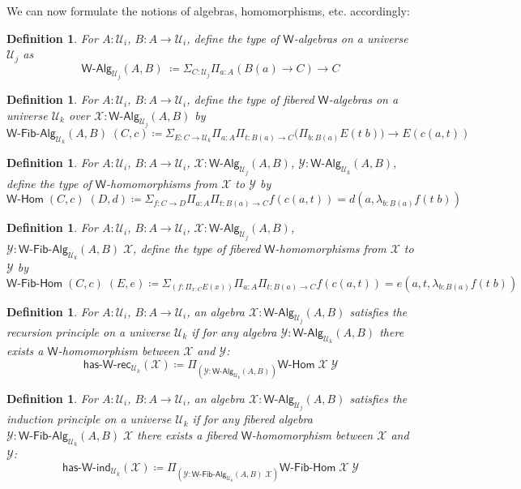 \documentclass[reqno,10pt,a4paper,oneside]{amsart}
\newcommand{\X}{\mathcal{X}}
\newcommand{\Y}{\mathcal{Y}}
\newcommand{\prd}[1]{\Pi_{#1}}
\newcommand{\sm}[1]{\Sigma_{#1}}
\newcommand{\lam}[1]{\lambda_{#1}}
\newcommand{\defeq}{\coloneqq}
\newcommand{\W}{\mathsf{W}}
\newcommand{\UU}{\mathcal{U}}
\newcommand{\WAlg}{\mathsf{W}\text{-}\mathsf{Alg}}
\newcommand{\WFibAlg}{\mathsf{W}\text{-}\mathsf{Fib}\text{-}\mathsf{Alg}}
\newcommand{\WHom}{\mathsf{W}\text{-}\mathsf{Hom}}
\newcommand{\WFibHom}{\mathsf{W}\text{-}\mathsf{Fib}\text{-}\mathsf{Hom}}
\newcommand{\HasWRec}{\mathsf{has}\text{-}\mathsf{W}\text{-}\mathsf{rec}}
\newcommand{\HasWInd}{\mathsf{has}\text{-}\mathsf{W}\text{-}\mathsf{ind}}
\numberwithin{equation}{section}
\theoremstyle{mythm}
\theoremstyle{mydef}
\newtheorem{definition}[theorem]{Definition}
\theoremstyle{myrmk}
\begin{document}
We can now formulate the notions of algebras, homomorphisms, etc. accordingly:

\begin{definition}\label{def:WAlg}
For $A:\UU_i$, $B : A \to \UU_i$, define the type of \emph{$\W$-algebras} on a universe $\UU_j$ as
\[\WAlg_{\UU_j}(A,B) \; \defeq \sm{C : \UU_j} \prd{a:A} (B(a) \to C) \to C \]
\end{definition}

\begin{definition}\label{def:WFibAlg}
For $A:\UU_i$, $B : A \to \UU_i$, define the type of \emph{fibered $\W$-algebras} on a universe $\UU_k$ over $\mathcal{X} : \WAlg_{\UU_j}(A,B)$ by
\[\WFibAlg_{\UU_k}(A,B) \; (C,c) \defeq \sm{E : C \to \UU_k} \prd{a:A}\prd{t: B(a) \to C} \big(\prd{b:B(a)} E(t \;b) \big) \to E(c(a,t)) \]
\end{definition}

\begin{definition}\label{def:WHom}
For $A:\UU_i$, $B : A \to \UU_i$, $\X : \WAlg_{\UU_j}(A,B)$, $\Y : \WAlg_{\UU_k}(A,B)$, define the type of \emph{$\W$-homomorphisms} from $\X$ to $\Y$ by
\[ \WHom \; (C,c) \; (D,d) \defeq \sm{f:C\to D}\prd{a:A}\prd{t: B(a) \to C} f(c(a,t)) = d(a,\lam{b:B(a)} f(t\;b)) \]
\end{definition}

\begin{definition}\label{def:WFibHom}
For $A:\UU_i$, $B : A \to \UU_i$, $\X : \WAlg_{\UU_j}(A,B)$, $\Y : \WFibAlg_{\UU_k}(A,B) \; \X$, define the type of \emph{fibered $\W$-homomorphisms} from $\X$ to $\Y$ by
\[ \WFibHom \; (C,c) \; (E,e) \defeq \sm{(f:\prd{x:C}E(x))}\prd{a:A}\prd{t: B(a) \to C} f(c(a,t)) = e(a,t,\lam{b:B(a)} f(t\;b)) \]
\end{definition}

\begin{definition}\label{def:WRec}
For $A:\UU_i$, $B : A \to \UU_i$, an algebra $\X : \WAlg_{\UU_j}(A,B)$ \emph{satisfies the recursion principle} on a universe $\UU_k$ if for any algebra $\Y : \WAlg_{\UU_k}(A,B)$ there exists
a $\W$-homomorphism between $\X$ and $\Y$:
\[ \HasWRec_{\UU_k}(\X) \defeq \prd{(\Y:\WAlg_{\UU_k}(A,B))} \WHom \; \X \; \Y \]
\end{definition}

\begin{definition}\label{def:WInd}
For $A:\UU_i$, $B : A \to \UU_i$, an algebra $\X : \WAlg_{\UU_j}(A,B)$ \emph{satisfies the induction principle} on a universe $\UU_k$ if for any fibered algebra $\Y : \WFibAlg_{\UU_k}(A,B) \; \X$ there exists a fibered $\W$-homomorphism between $\X$ and $\Y$:
\[ \HasWInd_{\UU_k}(\X) \defeq \prd{(\Y:\WFibAlg_{\UU_k}(A,B) \; \X)} \WFibHom \; \X \; \Y \]
\end{definition}
\end{document}
